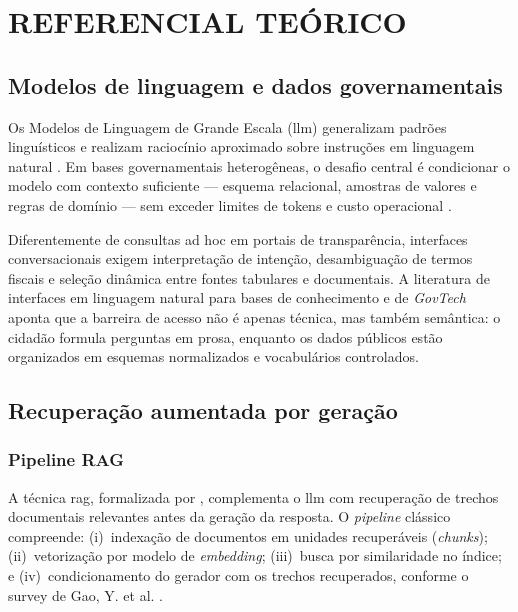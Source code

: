 \chapter{\MakeUppercase{Referencial Teórico}}

\section{Modelos de linguagem e dados governamentais}

Os Modelos de Linguagem de Grande Escala (\gls{llm}) generalizam padrões linguísticos e realizam raciocínio aproximado sobre instruções em linguagem natural \cite{OpenAI2024GPT4}. Em bases governamentais heterogêneas, o desafio central é condicionar o modelo com contexto suficiente --- esquema relacional, amostras de valores e regras de domínio --- sem exceder limites de tokens e custo operacional \cite{Liu2023LostMiddle}.

Diferentemente de consultas ad hoc em portais de transparência, interfaces conversacionais exigem interpretação de intenção, desambiguação de termos fiscais e seleção dinâmica entre fontes tabulares e documentais. A literatura de interfaces em linguagem natural para bases de conhecimento \cite{KatsogiannisMeimaris2023GovChat} e de \textit{GovTech} \cite{Janssen2020GovTech} aponta que a barreira de acesso não é apenas técnica, mas também semântica: o cidadão formula perguntas em prosa, enquanto os dados públicos estão organizados em esquemas normalizados e vocabulários controlados.

\section{Recuperação aumentada por geração}

\subsection{Pipeline RAG}

A técnica \gls{rag}, formalizada por , complementa o \gls{llm} com recuperação de trechos documentais relevantes antes da geração da resposta. O \textit{pipeline} clássico compreende: (i)~indexação de documentos em unidades recuperáveis (\textit{chunks}); (ii)~vetorização por modelo de \textit{embedding}; (iii)~busca por similaridade no índice; e (iv)~condicionamento do gerador com os trechos recuperados, conforme o survey de Gao, Y. et al. \cite{Gao2024RAGSurvey}.

